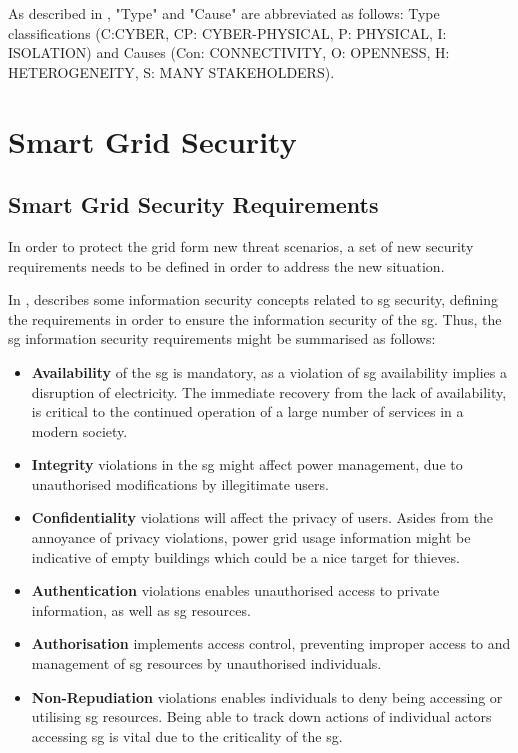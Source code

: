 As described in \citeauthor{humayed2017cyber}, "Type" and "Cause" are abbreviated as follows: Type classifications (C:CYBER, CP: CYBER-PHYSICAL, P: PHYSICAL, I: ISOLATION) and Causes (Con: CONNECTIVITY, O: OPENNESS, H: HETEROGENEITY,  S: MANY STAKEHOLDERS).






\section{Smart Grid  Security} 

\subsection{Smart Grid Security Requirements}
In order to protect the grid form new threat scenarios, a set of new security requirements needs to be defined in order to address the new situation. 
 
In \cite{Shapsough2015}, \citeauthor{Shapsough2015}  describes some information security concepts related to \acrlong{sg} security, defining the requirements in order to ensure the information security of the \acrshort{sg}. Thus, the \acrlong{sg} information security requirements might be summarised as follows:

\begin{itemize}
    \item \textbf{Availability} of the \acrlong{sg} is mandatory, as a violation of \acrlong{sg} availability implies a disruption of electricity. The immediate recovery from the lack of availability, is critical to the continued operation of a large number of services in a modern society.  
    \item \textbf{Integrity} violations in the \acrshort{sg} might affect power management, due to unauthorised modifications by illegitimate users. 
    \item \textbf{Confidentiality} violations will affect the privacy of users. Asides from the annoyance of privacy violations, power grid usage information might be indicative of empty buildings which could be a nice target for thieves. \item \textbf{Authentication} violations enables unauthorised access to private information, as well as \acrfull{sg} resources.
    \item \textbf{Authorisation} implements access control, preventing improper access to and management of \acrshort{sg} resources by unauthorised individuals.      \item \textbf{Non-Repudiation} violations enables individuals to deny being accessing or utilising \acrshort{sg} resources. Being able to track down actions of individual actors accessing \acrshort{sg} is vital due to the criticality of the \acrshort{sg}.
\end{itemize}


